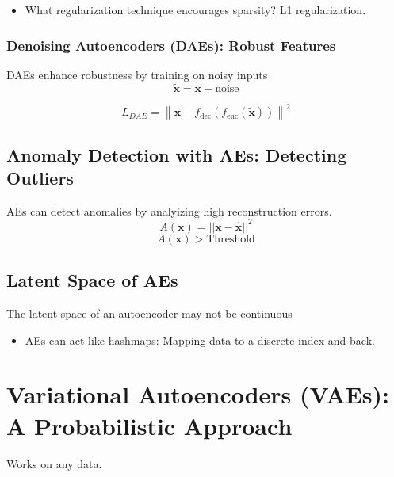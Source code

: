 \begin{notes}
    \begin{itemize}
        \item What regularization technique encourages sparsity? L1 regularization.
    \end{itemize}
\end{notes}

\subsubsection{Denoising Autoencoders (DAEs): Robust Features}
\begin{definition}
    DAEs enhance robustness by training on noisy inputs
    \[
    \tilde{\mathbf{x}} = \mathbf{x} + \text{noise}
    \]

    \[
    L_{DAE} = \left\| \mathbf{x} - f_{\text{dec}}(f_{\text{enc}}(\tilde{\mathbf{x}})) \right\|^2
    \]
\end{definition}

\subsection{Anomaly Detection with AEs: Detecting Outliers}
\begin{definition}
    AEs can detect anomalies by analyizing high reconstruction errors.
    \begin{equation}
        A(\mathbf{x}) = ||\mathbf{x} - \hat{\mathbf{x}}||^2
    \end{equation}
    \begin{equation}
        A(\mathbf{x}) > \text{Threshold}
    \end{equation}
\end{definition}

\subsection{Latent Space of AEs}
\begin{definition}
    The latent space of an autoencoder may not be continuous
    \begin{itemize}
        \item AEs can act like hashmaps: Mapping data to a discrete index and back. 
    \end{itemize}
\end{definition}
\newpage

\section{Variational Autoencoders (VAEs): A Probabilistic Approach}
\begin{warning}
    Works on any data.
\end{warning}

